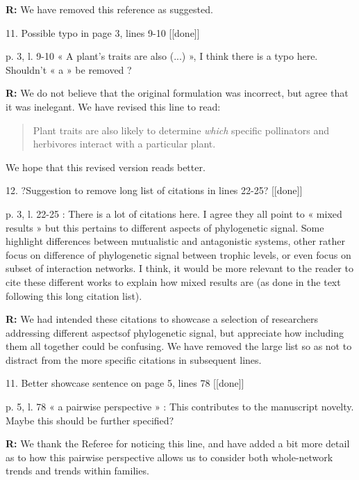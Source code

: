 \documentclass[12pt]{letter}
\newenvironment{refquote}{\bigskip \begin{it}}{\end{it}\smallskip}
\begin{document}
	\textbf{R:} We have removed this reference as suggested.


11. Possible typo in page 3, lines 9-10 [[done]]
	
	\begin{refquote}
		p. 3, l. 9-10 « A plant’s traits are also (...) », I think there is a typo here. Shouldn’t « a » be removed ?
	\end{refquote}


	\textbf{R:} We do not believe that the original formulation was incorrect, but agree that it was inelegant. We have revised this line to read:
	\begin{quotation}
		Plant traits are also likely to determine \emph{which} specific pollinators and herbivores interact with a particular plant.
  	\end{quotation}
  	We hope that this revised version reads better.


12. ?Suggestion to remove long list of citations in lines 22-25? [[done]]

	\begin{refquote}
		p. 3, l. 22-25 : There is a lot of citations here. I agree they all point to « mixed results » but this pertains to different aspects of phylogenetic signal. Some highlight differences between mutualistic and antagonistic systems, other rather focus on difference of phylogenetic signal between trophic levels, or even focus on subset of interaction networks. I think, it would be more relevant to the reader to cite these different works to explain how mixed results are (as done in the text following this long citation list).
	\end{refquote}


	\textbf{R:} We had intended these citations to showcase a selection of researchers addressing different aspectsof phylogenetic signal, but appreciate how including them all together could be confusing. We have removed the large list so as not to distract from the more specific citations in subsequent lines.


11. Better showcase sentence on page 5, lines 78 [[done]]

	\begin{refquote}
		p. 5, l. 78 « a pairwise perspective » : This contributes to the manuscript novelty. Maybe this should be further specified?
	\end{refquote}

	\textbf{R:} We thank the Referee for noticing this line, and have added a bit more detail as to how this pairwise perspective allows us to consider both whole-network trends and trends within families.
\end{document}
